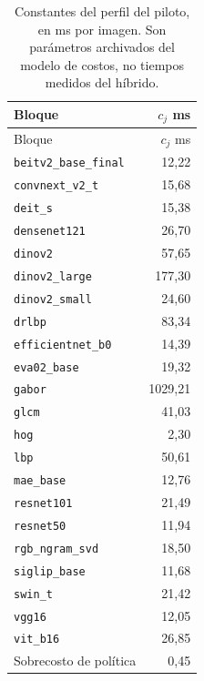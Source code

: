 \begin{longtable}{@{}lr@{}}
\caption{Constantes del perfil del piloto, en ms por imagen. Son parámetros archivados del modelo de costos, no tiempos medidos del híbrido.}\label{tab:perfil-costos}\\
\toprule Bloque & $c_j$ ms\\ \midrule \endfirsthead
\toprule Bloque & $c_j$ ms\\ \midrule \endhead
\texttt{beitv2\_base\_final} & 12,22\\
\texttt{convnext\_v2\_t} & 15,68\\
\texttt{deit\_s} & 15,38\\
\texttt{densenet121} & 26,70\\
\texttt{dinov2} & 57,65\\
\texttt{dinov2\_large} & 177,30\\
\texttt{dinov2\_small} & 24,60\\
\texttt{drlbp} & 83,34\\
\texttt{efficientnet\_b0} & 14,39\\
\texttt{eva02\_base} & 19,32\\
\texttt{gabor} & 1029,21\\
\texttt{glcm} & 41,03\\
\texttt{hog} & 2,30\\
\texttt{lbp} & 50,61\\
\texttt{mae\_base} & 12,76\\
\texttt{resnet101} & 21,49\\
\texttt{resnet50} & 11,94\\
\texttt{rgb\_ngram\_svd} & 18,50\\
\texttt{siglip\_base} & 11,68\\
\texttt{swin\_t} & 21,42\\
\texttt{vgg16} & 12,05\\
\texttt{vit\_b16} & 26,85\\
\midrule Sobrecosto de política & 0,45\\
\bottomrule
\end{longtable}
